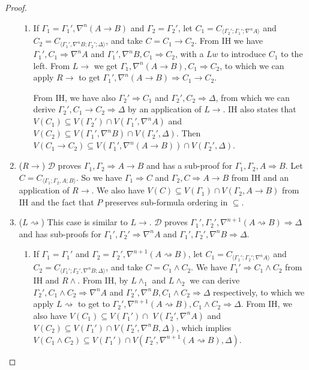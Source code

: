 \documentclass[12pt,a4paper]{article}
\theoremstyle{plain}
\theoremstyle{definition}
\begin{document}
\begin{proof}
\begin{enumerate}
\begin{enumerate}
		\item If $\Gamma_1 = \Gamma_1' , \nabla^n (A \rightarrow B)$ and $\Gamma_2 = \Gamma_2'$, let $C_1 = C_{\langle\Gamma_2';\Gamma_1';\nabla^n A\rangle}$ and $C_2 = C_{\langle\Gamma_1',\nabla^n B;\Gamma_2';\Delta\rangle}$, and take $C = C_1 \rightarrow C_2$.
		From IH we have $\Gamma_1' , C_1 \Rightarrow \nabla^n A$ and $\Gamma_1' , \nabla^n B , C_1 \Rightarrow C_2$, with a $Lw$ to introduce $C_1$ to the left. From $L\rightarrow$ we get $\Gamma_1 , \nabla^n (A \rightarrow B) , C_1 \Rightarrow C_2$, to which we can apply $R\rightarrow$ to get $\Gamma_1' , \nabla^n (A \rightarrow B) \Rightarrow C_1 \rightarrow C_2$.

		From IH, we have also $\Gamma_2' \Rightarrow C_1$ and $\Gamma_2' , C_2 \Rightarrow \Delta$, from which we can derive $\Gamma_2' , C_1 \rightarrow C_2 \Rightarrow \Delta$ by an application of $L\rightarrow$. IH also states that $V(C_1) \subseteq V(\Gamma_2') \cap V(\Gamma_1' , \nabla^n A)$ and $V(C_2) \subseteq V(\Gamma_1' , \nabla^n B) \cap V(\Gamma_2' , \Delta)$. Then $V(C_1 \rightarrow C_2) \subseteq V(\Gamma_1' , \nabla^n (A \rightarrow B)) \cap V(\Gamma_2' , \Delta)$.
	\end{enumerate}

	\item ($R\rightarrow$) $\mathcal{D}$ proves $\Gamma_1 , \Gamma_2 \Rightarrow A \rightarrow B$ and has a sub-proof for $\Gamma_1 , \Gamma_2 , A \Rightarrow B$. Let $C = C_{\langle\Gamma_1;\Gamma_2,A;B\rangle}$. So we have $\Gamma_1 \Rightarrow C$ and $\Gamma_2 , C \Rightarrow A \rightarrow B$ from IH and an application of $R\rightarrow$.
	We also have $V(C) \subseteq V(\Gamma_1) \cap V(\Gamma_2 , A \rightarrow B)$ from IH and the fact that $P$ preserves sub-formula ordering in $\subseteq$.

	\item ($L\rightsquigarrow$) This case is similar to $L\rightarrow$. $\mathcal{D}$ proves $\Gamma_1' , \Gamma_2' , \nabla^{n+1} (A \rightsquigarrow B) \Rightarrow \Delta$ and has sub-proofs for $\Gamma_1' , \Gamma_2' \Rightarrow \nabla^n A$ and $\Gamma_1' , \Gamma_2' , \nabla^n B \Rightarrow \Delta$.
	\begin{enumerate}
		\item If $\Gamma_1 = \Gamma_1'$ and $\Gamma_2 = \Gamma_2' , \nabla^{n+1} (A \rightsquigarrow B)$, let $C_1 = C_{\langle\Gamma_1';\Gamma_2';\nabla^n A\rangle}$ and $C_2 = C_{\langle\Gamma_1';\Gamma_2',\nabla^n B;\Delta\rangle}$, and take $C = C_1 \land C_2$.
		We have $\Gamma_1' \Rightarrow C_1 \land C_2$ from IH and $R\land$.
		From IH, by $L\land_1$ and $L\land_2$ we can derive $\Gamma_2' , C_1 \land C_2 \Rightarrow \nabla^n A$ and $\Gamma_2' , \nabla^n B , C_1 \land C_2 \Rightarrow \Delta$ respectively, to which we apply $L\rightsquigarrow$ to get to $\Gamma_2' , \nabla^{n+1} (A \rightsquigarrow B) , C_1 \land C_2 \Rightarrow \Delta$.
		From IH, we also have $V(C_1) \subseteq V(\Gamma_1') \cap$ $V(\Gamma_2' , \nabla^n A)$ and $V(C_2) \subseteq V(\Gamma_1') \cap V(\Gamma_2' , \nabla^n B , \Delta)$, which implies $V(C_1 \land C_2) \subseteq V(\Gamma_1') \cap V(\Gamma_2' , \nabla^{n+1} (A \rightsquigarrow B) , \Delta)$.


\end{enumerate}
\end{enumerate}
\end{proof}
\end{document}
